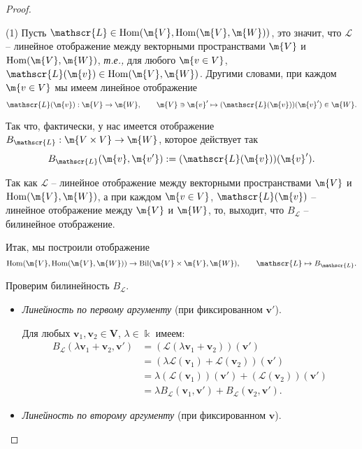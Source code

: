 \begin{proof}~

(1) Пусть $\mathscr{L}\in \mathrm{Hom}(\m{V}, \mathrm{Hom}(\m{V}, \m{W}))$, это значит, что $\mathscr{L}$ -- линейное отображение между векторными пространствами $\m{V}$ и $\mathrm{Hom}(\m{V},\m{W})$, \textit{т.е.,} для любого $\m{v \in V}$, $\mathscr{L}(\m{v}) \in \mathrm{Hom}(\m{V},\m{W})$. Другими словами, при каждом $\m{v \in V}$ мы имеем линейное отображение
    $$\mathscr{L}(\m{v}): \m{V} \to \m{W}, \qquad \m{V} \ni  \m{v}' \mapsto (\mathscr{L}(\m{v}))(\m{v}') \in \m{W}.$$

Так что, фактически, у нас имеется отображение $B_\mathscr{L}:\m{V\times V} \to \m{W}$, которое действует так
\[
 B_\mathscr{L}(\m{v}, \m{v'}): = (\mathscr{L}(\m{v}))(\m{v}').
\]

Так как $\mathscr{L}$ -- линейное отображение между векторными пространствами $\m{V}$ и $\mathrm{Hom}(\m{V},\m{W})$, а при каждом $\m{v\in V}$, $\mathscr{L}(\m{v})$ -- линейное отображение между $\m{V}$ и $\m{W}$, то, выходит, что $B_\mathscr{L}$ -- билинейное отображение.

Итак, мы построили отображение
 \[
 \mathrm{Hom}(\m{V}, \mathrm{Hom}(\m{V}, \m{W})) \to   \mathrm{Bil}(\m{V}\times \m{V}, \m{W}), \qquad \mathscr{L} \mapsto B_\mathscr{L}.
\]

Проверим билинейность $B_{\mathscr{L}}$.

  \begin{itemize}
     \item \textit{Линейность по первому аргументу} (при фиксированном $\mathbf{v}'$).
     
        Для любых $\mathbf{v}_1, \mathbf{v}_2 \in \mathbf{V}$, $\lambda \in \Bbbk$ имеем:
        \[
            \begin{split}
                B_{\mathscr{L}}(\lambda\mathbf{v}_1 + \mathbf{v}_2, \mathbf{v}')
                &= (\mathscr{L}(\lambda\mathbf{v}_1 + \mathbf{v}_2))(\mathbf{v}') \\
                &= (\lambda\mathscr{L}(\mathbf{v}_1) + \mathscr{L}(\mathbf{v}_2))(\mathbf{v}') \\
                &= \lambda(\mathscr{L}(\mathbf{v}_1))(\mathbf{v}') + (\mathscr{L}(\mathbf{v}_2))(\mathbf{v}') \\
                &= \lambda B_{\mathscr{L}}(\mathbf{v}_1, \mathbf{v}') + B_{\mathscr{L}}(\mathbf{v}_2, \mathbf{v}').
            \end{split}
        \]
        
        \item \textit{Линейность по второму аргументу} (при фиксированном $\mathbf{v}$).
        

\end{itemize}
\end{proof}
